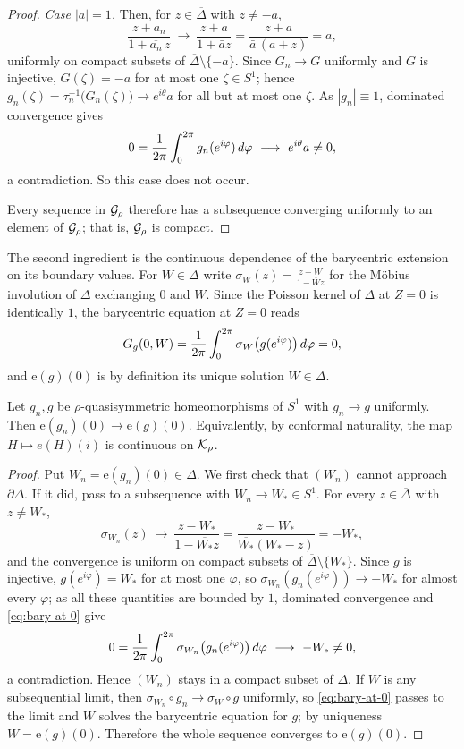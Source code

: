 \begin{proof}
	\emph{Case $|a|=1$.} Then, for $z\in\overline\Delta$ with $z\neq-a$,
	\[
	\frac{z+a_n}{1+\overline{a_n}\,z}\ \longrightarrow\ \frac{z+a}{1+\bar az}
	=\frac{z+a}{\bar a\,(a+z)}=a ,
	\]
	uniformly on compact subsets of $\overline\Delta\setminus\{-a\}$. Since
	$G_n\to G$ uniformly and $G$ is injective, $G(\zeta)=-a$ for at most one
	$\zeta\in S^1$; hence $g_n(\zeta)=\tau_n^{-1}\bigl(G_n(\zeta)\bigr)\to
	e^{i\theta}a$ for all but at most one $\zeta$. As $|g_n|\equiv1$, dominated
	convergence gives
	\[
	0=\avg{g_n(e^{i\varphi})}\ \longrightarrow\ e^{i\theta}a\neq0 ,
	\]
	a contradiction. So this case does not occur.
	
	Every sequence in $\mathcal{G}_\rho$ therefore has a subsequence converging uniformly
	to an element of $\mathcal{G}_\rho$; that is, $\mathcal{G}_\rho$ is compact.
\end{proof}

The second ingredient is the continuous dependence of the barycentric extension
on its boundary values. For $W\in\Delta$ write
$\sigma_W(z)=\frac{z-W}{1-\overline Wz}$ for the M\"obius involution of
$\Delta$ exchanging $0$ and $W$. Since the Poisson kernel of $\Delta$ at $Z=0$
is identically $1$, the barycentric equation at $Z=0$ reads
\begin{equation}\label{eq:bary-at-0}
	G_g(0,W)=\frac{1}{2\pi}\int_0^{2\pi} \sigma_W\bigl(g(e^{i\varphi})\bigr) \,d\varphi=0 ,
\end{equation}
and $\mathrm{e}(g)(0)$ is by definition its unique solution $W\in\Delta$.

\begin{lemma}\label{lem:de-cont}
	Let $g_n,g$ be $\rho$-quasisymmetric homeomorphisms of $S^1$ with $g_n\to g$
	uniformly. Then $\mathrm{e}(g_n)(0)\to\mathrm{e}(g)(0)$. Equivalently, by
	conformal naturality, the map $H\mapsto e(H)(i)$ is continuous on $\mathcal{K}_\rho$.
\end{lemma}

\begin{proof}
	Put $W_n=\mathrm{e}(g_n)(0)\in\Delta$. We first check that $(W_n)$ cannot
	approach $\partial\Delta$. If it did, pass to a subsequence with
	$W_n\to W_*\in S^1$. For every $z\in\overline\Delta$ with $z\neq W_*$,
	\[
	\sigma_{W_n}(z)\ \longrightarrow\ \frac{z-W_*}{1-\overline{W_*}z}
	=\frac{z-W_*}{\overline{W_*}(W_*-z)}=-W_* ,
	\]
	and the convergence is uniform on compact subsets of
	$\overline\Delta\setminus\{W_*\}$. Since $g$ is injective, $g(e^{i\varphi})=W_*$
	for at most one $\varphi$, so $\sigma_{W_n}(g_n(e^{i\varphi}))\to-W_*$ for
	almost every $\varphi$; as all these quantities are bounded by $1$, dominated
	convergence and \eqref{eq:bary-at-0} give
	\[
	0=\avg{\sigma_{W_n}\bigl(g_n(e^{i\varphi})\bigr)}\ \longrightarrow\ -W_*\neq0 ,
	\]
	a contradiction. Hence $(W_n)$ stays in a compact subset of $\Delta$. If $W$ is
	any subsequential limit, then $\sigma_{W_n}\circ g_n\to\sigma_W\circ g$
	uniformly, so \eqref{eq:bary-at-0} passes to the limit and $W$ solves the
	barycentric equation for $g$; by uniqueness $W=\mathrm{e}(g)(0)$. Therefore the
	whole sequence converges to $\mathrm{e}(g)(0)$.
\end{proof}

